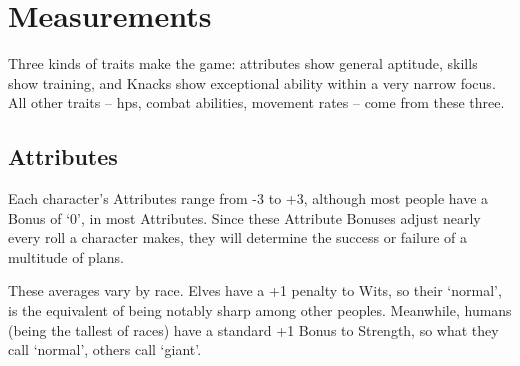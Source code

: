 \chapter{Measurements}

Three kinds of \glspl{trait} make the game: \glspl{attribute} show general aptitude, \glspl{skill} show training, and Knacks show exceptional ability within a very narrow focus.
All other \glspl{trait} -- \glspl{hp}, combat abilities, movement rates -- come from these three.

\section{Attributes}
\label{randomAttributes}

\begin{multicols}{2}


\noindent
Each character's Attributes range from -3 to +3, although most people have a Bonus of `0', in most Attributes.
Since these Attribute Bonuses adjust nearly every roll a character makes, they will determine the success or failure of a multitude of plans.

These averages vary by race.
Elves have a +1 penalty to Wits, so their `normal', is the equivalent of being notably sharp among other peoples.
Meanwhile, humans (being the tallest of races) have a standard +1 Bonus to Strength, so what they call `normal', others call `giant'.


\end{multicols}

